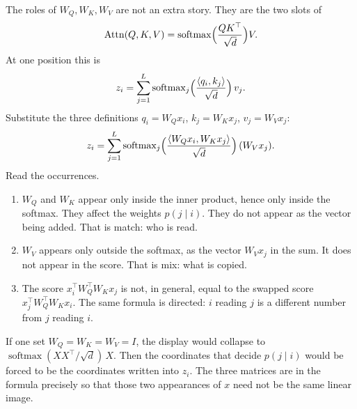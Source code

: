 \documentclass[11pt,a4paper]{article}
\DeclareMathOperator{\softmax}{softmax}
\theoremstyle{definition}
\begin{document}
\begin{remark}
\label{rem:spr2025-nlp-qkv-from-formula}
The roles of \(W_Q,W_K,W_V\) are not an extra story. They are the two slots of
\[
\mathrm{Attn}(Q,K,V)
=\softmax\Bigl(\frac{QK^\top}{\sqrt{d}}\Bigr)V.
\]
At one position this is
\[
z_i
=\sum_{j=1}^{L}
\mathrm{softmax}_j\Bigl(\frac{\langle q_i,k_j\rangle}{\sqrt{d}}\Bigr)\,v_j.
\]
Substitute the three definitions \(q_i=W_Q x_i\), \(k_j=W_K x_j\), \(v_j=W_V x_j\):
\[
z_i
=\sum_{j=1}^{L}
\mathrm{softmax}_j\Bigl(\frac{\langle W_Q x_i,W_K x_j\rangle}{\sqrt{d}}\Bigr)\,(W_V x_j).
\]
Read the occurrences.
\begin{enumerate}[leftmargin=1.4em,itemsep=0.25em]
  \item \(W_Q\) and \(W_K\) appear only inside the inner product, hence only inside the softmax. They affect the weights \(p(j\mid i)\). They do not appear as the vector being added. That is match: who is read.
  \item \(W_V\) appears only outside the softmax, as the vector \(W_V x_j\) in the sum. It does not appear in the score. That is mix: what is copied.
  \item The score \(x_i^\top W_Q^\top W_K x_j\) is not, in general, equal to the swapped score \(x_j^\top W_Q^\top W_K x_i\). The same formula is directed: \(i\) reading \(j\) is a different number from \(j\) reading \(i\).
\end{enumerate}
If one set \(W_Q=W_K=W_V=I\), the display would collapse to \(\softmax(XX^\top/\sqrt{d})\,X\). Then the coordinates that decide \(p(j\mid i)\) would be forced to be the coordinates written into \(z_i\). The three matrices are in the formula precisely so that those two appearances of \(x\) need not be the same linear image.
\end{remark}
\end{document}
